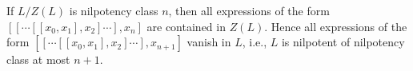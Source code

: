If $L/Z(L)$ is nilpotency class $n$, then all expressions of the form
$[[\cdots[[x_0, x_1], x_2]\cdots], x_n]$ are contained in $Z(L)$. Hence
all expressions of the form $[[\cdots[[x_0, x_1], x_2]\cdots], x_{n+1}]$ vanish
in $L$, i.e., $L$ is nilpotent of nilpotency class at most $n+1$.
